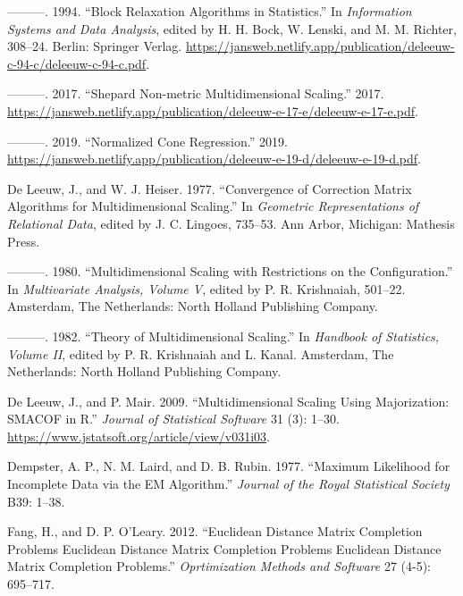 \documentclass[
  12pt,
]{article}
\newlength{\cslhangindent}
\newenvironment{CSLReferences}[2] %
 {\begin{list}{}{%
  \setlength{\itemindent}{0pt}
  \setlength{\leftmargin}{0pt}
  \setlength{\parsep}{0pt}
  \ifodd #1
   \setlength{\leftmargin}{\cslhangindent}
   \setlength{\itemindent}{-1\cslhangindent}
  \fi
  \setlength{\itemsep}{#2\baselineskip}}}
 {\end{list}}
\begin{document}
\begin{CSLReferences}{1}{0}
---------. 1994. {``{Block Relaxation Algorithms in Statistics}.''} In \emph{Information Systems and Data Analysis}, edited by H. H. Bock, W. Lenski, and M. M. Richter, 308--24. Berlin: Springer Verlag. \url{https://jansweb.netlify.app/publication/deleeuw-c-94-c/deleeuw-c-94-c.pdf}.

---------. 2017. {``{Shepard Non-metric Multidimensional Scaling}.''} 2017. \url{https://jansweb.netlify.app/publication/deleeuw-e-17-e/deleeuw-e-17-e.pdf}.

---------. 2019. {``Normalized Cone Regression.''} 2019. \url{https://jansweb.netlify.app/publication/deleeuw-e-19-d/deleeuw-e-19-d.pdf}.

De Leeuw, J., and W. J. Heiser. 1977. {``Convergence of Correction Matrix Algorithms for Multidimensional Scaling.''} In \emph{Geometric Representations of Relational Data}, edited by J. C. Lingoes, 735--53. Ann Arbor, Michigan: Mathesis Press.

---------. 1980. {``Multidimensional Scaling with Restrictions on the Configuration.''} In \emph{Multivariate Analysis, Volume {V}}, edited by P. R. Krishnaiah, 501--22. Amsterdam, The Netherlands: North Holland Publishing Company.

---------. 1982. {``Theory of Multidimensional Scaling.''} In \emph{Handbook of Statistics, Volume {II}}, edited by P. R. Krishnaiah and L. Kanal. Amsterdam, The Netherlands: North Holland Publishing Company.

De Leeuw, J., and P. Mair. 2009. {``{Multidimensional Scaling Using Majorization: SMACOF in R}.''} \emph{Journal of Statistical Software} 31 (3): 1--30. \url{https://www.jstatsoft.org/article/view/v031i03}.

Dempster, A. P., N. M. Laird, and D. B. Rubin. 1977. {``{Maximum Likelihood for Incomplete Data via the EM Algorithm}.''} \emph{Journal of the Royal Statistical Society} B39: 1--38.

Fang, H., and D. P. O'Leary. 2012. {``Euclidean Distance Matrix Completion Problems Euclidean Distance Matrix Completion Problems Euclidean Distance Matrix Completion Problems.''} \emph{Oprtimization Methods and Software} 27 (4-5): 695--717.


\end{CSLReferences}
\end{document}
